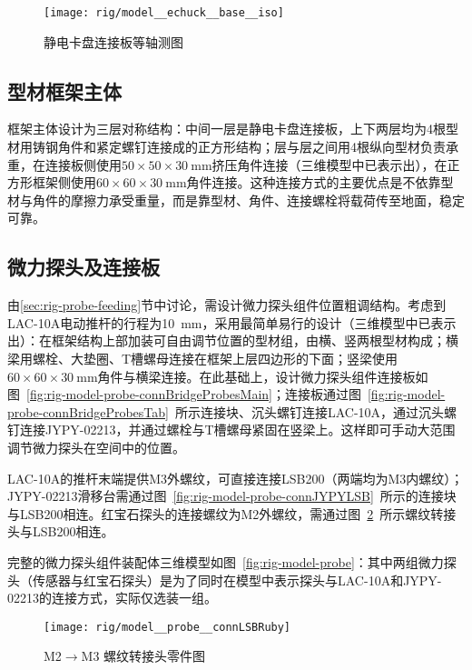 \begin{figure}[thbp]
\centering
\texttt{[image: rig/model\_\_echuck\_\_base\_\_iso]}
\caption{静电卡盘连接板等轴测图}
\label{fig:rig-model-echuck-base-iso}
\end{figure}


\subsection{型材框架主体}\label{sec:rig-model-frame}

框架主体设计为三层对称结构：中间一层是静电卡盘连接板，上下两层均为4根型材用铸钢角件和紧定螺钉连接成的正方形结构；层与层之间用4根纵向型材负责承重，在连接板侧使用$\num{50}\times\num{50}\times\SI{30}{\mm}$挤压角件连接（三维模型中已表示出），在正方形框架侧使用$\num{60}\times\num{60}\times\SI{30}{\mm}$角件连接。这种连接方式的主要优点是不依靠型材与角件的摩擦力承受重量，而是靠型材、角件、连接螺栓将载荷传至地面，稳定可靠。


\subsection{微力探头及连接板}\label{sec:rig-model-probe}

由\ref{sec:rig-probe-feeding}节中讨论，需设计微力探头组件位置粗调结构。考虑到LAC-10A电动推杆的行程为\SI{10}{\mm}，采用最简单易行的设计（三维模型中已表示出）：在框架结构上部加装可自由调节位置的型材组，由横、竖两根型材构成；横梁用螺栓、大垫圈、T槽螺母连接在框架上层四边形的下面；竖梁使用$\num{60}\times\num{60}\times\SI{30}{\mm}$角件与横梁连接。在此基础上，设计微力探头组件连接板如图~\ref{fig:rig-model-probe-connBridgeProbesMain}；连接板通过图~\ref{fig:rig-model-probe-connBridgeProbesTab}~所示连接块、沉头螺钉连接LAC-10A，通过沉头螺钉连接JYPY-02213，并通过螺栓与T槽螺母紧固在竖梁上。这样即可手动大范围调节微力探头在空间中的位置。

LAC-10A的推杆末端提供M3外螺纹，可直接连接LSB200（两端均为M3内螺纹）；JYPY-02213滑移台需通过图~\ref{fig:rig-model-probe-connJYPYLSB}~所示的连接块与LSB200相连。红宝石探头的连接螺纹为M2外螺纹，需通过图~\ref{fig:rig-model-probe-connLSBRuby}~所示螺纹转接头与LSB200相连。

完整的微力探头组件装配体三维模型如图~\ref{fig:rig-model-probe}：其中两组微力探头（传感器与红宝石探头）是为了同时在模型中表示探头与LAC-10A和JYPY-02213的连接方式，实际仅选装一组。

\begin{figure}[thbp]
\centering
\texttt{[image: rig/model\_\_probe\_\_connLSBRuby]}
\caption{M2$\to$M3 螺纹转接头零件图}
\label{fig:rig-model-probe-connLSBRuby}
\end{figure}

